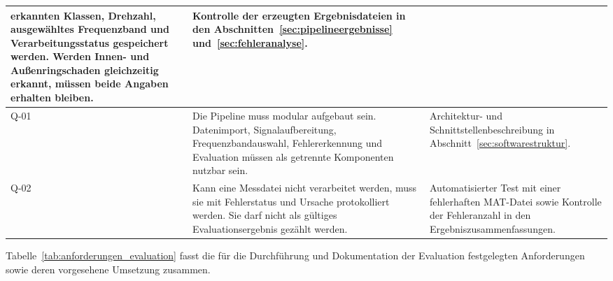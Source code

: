 \begin{longtable}{|
    >{\raggedright\arraybackslash}p{1.0cm}|
    >{\raggedright\arraybackslash}p{8.0cm}|
    >{\raggedright\arraybackslash}p{\dimexpr\textwidth-9.0cm-6\tabcolsep-4\arrayrulewidth\relax}|}
    erkannten Klassen, Drehzahl, ausgewähltes Frequenzband und
    Verarbeitungsstatus gespeichert werden. Werden Innen- und Außenringschaden
    gleichzeitig erkannt, müssen beide Angaben erhalten bleiben. & Kontrolle
    der erzeugten Ergebnisdateien in den
    Abschnitten~\ref{sec:pipelineergebnisse} und~\ref{sec:fehleranalyse}. \\
    \hline
    \leavevmode\hypertarget{req:Q-01}{Q-01} & Die Pipeline muss modular aufgebaut sein. Datenimport,
    Signalaufbereitung, Frequenzbandauswahl, Fehlererkennung und Evaluation
    müssen als getrennte Komponenten nutzbar sein. & Architektur- und
    Schnittstellenbeschreibung in Abschnitt~\ref{sec:softwarestruktur}. \\
    \hline
    \leavevmode\hypertarget{req:Q-02}{Q-02} & Kann eine Messdatei nicht verarbeitet werden, muss sie mit
    Fehlerstatus und Ursache protokolliert werden. Sie darf nicht als gültiges
    Evaluationsergebnis gezählt werden. & Automatisierter Test mit einer
    fehlerhaften MAT-Datei sowie Kontrolle der Fehleranzahl in den
    Ergebniszusammenfassungen. \\
    \hline
\end{longtable}
\endgroup

\newpage
{}
\label{par:festlegungen_evaluation}
Tabelle~\ref{tab:anforderungen_evaluation} fasst die für die Durchführung und
Dokumentation der Evaluation festgelegten Anforderungen sowie deren
vorgesehene Umsetzung zusammen.


